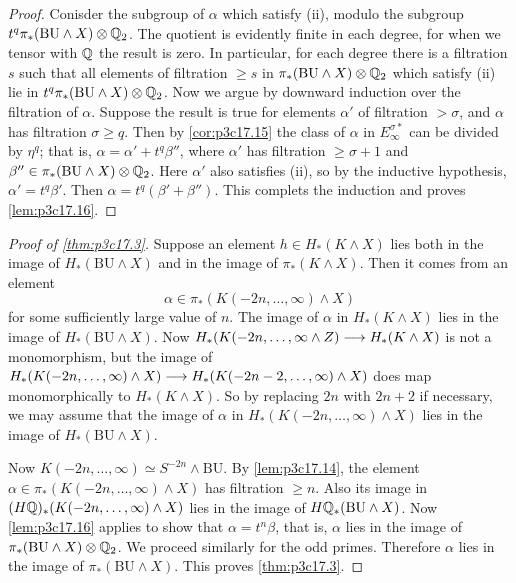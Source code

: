 \documentclass[../main]{subfiles}
\begin{document}
\begin{proof}
Conisder the subgroup of $\alpha$ which satisfy (ii), modulo the subgroup $t^q \pi_\ast(\mathrm{BU} \wedge X) \otimes \mathbb{Q}_2$. The quotient is evidently finite in each degree, for when we tensor with $\mathbb{Q}$ the result is zero. In particular, for each degree there is a filtration $s$ such that all elements of filtration $\ge s$ in $\pi_\ast(\mathrm{BU} \wedge X) \otimes \mathbb{Q}_2$ which satisfy (ii) lie in $t^q \pi_\ast(\mathrm{BU} \wedge X) \otimes \mathbb{Q}_2$. Now we argue by downward induction over the filtration of $\alpha$. Suppose the result is true for elements $\alpha'$ of filtration $> \sigma$, and $\alpha$ has filtration $\sigma \ge q$. Then by \ref{cor:p3c17.15} the class of $\alpha$ in $E_\infty^{\sigma\ast}$ can be divided by $\eta^q$; that is, $\alpha = \alpha' + t^q \beta''$, where $\alpha'$ has filtration $\ge \sigma + 1$ and $\beta'' \in \pi_\ast(\mathrm{BU} \wedge X) \otimes \mathbb{Q}_2$. Here $\alpha'$ also satisfies (ii), so by the inductive hypothesis, $\alpha' = t^q \beta'$. Then $\alpha = t^q(\beta' + \beta'')$. This complets the induction and proves \ref{lem:p3c17.16}.
\end{proof}

\begin{proof}[Proof of \ref{thm:p3c17.3}]
Suppose an element $h \in H_\ast(K \wedge X)$ lies both in the image of $H_\ast(\mathrm{BU} \wedge X)$ and in the image of $\pi_\ast(K \wedge X)$. Then it comes from an element $$\alpha \in \pi_\ast(K(-2n, \ldots, \infty) \wedge X)$$ for some sufficiently large value of $n$. The image of $\alpha$ in $H_\ast(K \wedge X)$ lies in the image of $H_\ast(\mathrm{BU} \wedge X)$. Now $H_\ast(K(-2n, \ldots, \infty \wedge Z) \overset{}{\longrightarrow} H_\ast(K \wedge X)$ is not a monomorphism, but the image of $H_\ast(K(-2n, \ldots, \infty) \wedge X) \overset{}{\longrightarrow} H_\ast(K(-2n-2, \ldots, \infty) \wedge X)$ does map monomorphically to $H_\ast(K \wedge X)$. So by replacing $2n$ with $2n + 2$ if necessary, we may assume that the image of $\alpha$ in $H_\ast(K(-2n, \ldots, \infty) \wedge X)$ lies in the image of $H_\ast(\mathrm{BU} \wedge X)$.

Now $K(-2n, \ldots, \infty) \simeq S^{-2n} \wedge \mathrm{BU}$. By \ref{lem:p3c17.14}, the element $\alpha \in \pi_\ast(K(-2n, \ldots, \infty) \wedge X)$ has filtration $\ge n$. Also its image in $(H\mathbb{Q})_\ast(K(-2n, \ldots, \infty) \wedge X)$ lies in the image of $H\mathbb{Q}_\ast(\mathrm{BU} \wedge X)$. Now \ref{lem:p3c17.16} applies to show that $\alpha = t^n \beta$, that is, $\alpha$ lies in the image of $\pi_\ast(\mathrm{BU} \wedge X) \otimes \mathbb{Q}_2$. We proceed similarly for the odd primes. Therefore $\alpha$ lies in the image of $\pi_\ast(\mathrm{BU} \wedge X)$. This proves \ref{thm:p3c17.3}. 
\end{proof}
\end{document}
